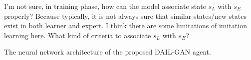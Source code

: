 


\begin{revcomment}
  I'm not sure, in training phase,
  how can the model associate state $s_L$ with $s_E$ properly?
  Because typically,
  it is not always sure that similar states/new states exist in both learner and expert.
  I think there are some limitations of imitation learning here.
  What kind of criteria to associate $s_L$ with $s_E$?

  {The neural network architecture of the proposed DAIL-GAN agent.\label{R2:DAIL:fig:Architecture}}
\end{revcomment}


